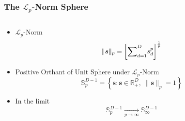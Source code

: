 \documentclass[aspectratio=169,10pt]{beamer}
\newlength{\frametextheight}
\begin{document}
\begin{frame}
    \frametitle{The $\mathcal{L}_p$-Norm Sphere}
    \begin{columns}
        \begin{column}{.49\textwidth}
            {\small 
            \begin{itemize}
                \item $\mathcal{L}_p$-Norm
                \[
                    \lVert \bm{s} \rVert_p = 
                        \left[{\scriptsize \sum}_{d = 1}^D s_d^p\right]^{\frac{1}{p}}
                \]
                \item Positive Orthant of Unit Sphere under $\mathcal{L}_p$-Norm
                \[
                    \mathbb{S}_p^{D-1} = \left\lbrace 
                        \bm{s} : \bm{s} \in \mathbb{R}_+^D, \; \lVert \bm{s}\rVert_p = 1
                        \right\rbrace
                \]
                \item In the limit
                \[
                    \mathbb{S}_p^{D-1} 
                        \xrightarrow[p\to\infty]{} \mathbb{S}_{\infty}^{D-1}
                \]
            \end{itemize}
            }
        \end{column}%
        \hfill
    \end{columns}
\end{frame} %
\end{document}
